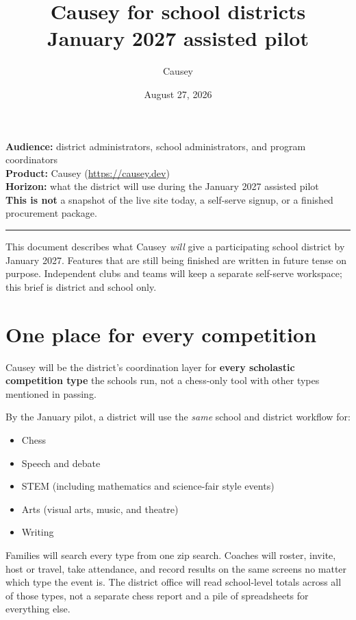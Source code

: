 \documentclass[11pt]{article}
\title{Causey for school districts\\[0.4em]
\large January 2027 assisted pilot}
\author{Causey}
\date{August 27, 2026}
\begin{document}
\maketitle

\noindent
\textbf{Audience:} district administrators, school administrators, and program coordinators\\
\textbf{Product:} Causey (\url{https://causey.dev})\\
\textbf{Horizon:} what the district will use during the January 2027 assisted pilot\\
\textbf{This is not} a snapshot of the live site today, a self-serve signup, or a finished procurement package.

\vspace{0.4em}
\hrule
\vspace{1em}

This document describes what Causey \emph{will} give a participating school district by January 2027. Features that are still being finished are written in future tense on purpose. Independent clubs and teams will keep a separate self-serve workspace; this brief is district and school only.

\section*{One place for every competition}

Causey will be the district's coordination layer for \textbf{every scholastic competition type} the schools run, not a chess-only tool with other types mentioned in passing.

By the January pilot, a district will use the \emph{same} school and district workflow for:

\begin{itemize}
  \item Chess
  \item Speech and debate
  \item STEM (including mathematics and science-fair style events)
  \item Arts (visual arts, music, and theatre)
  \item Writing
\end{itemize}

Families will search every type from one zip search. Coaches will roster, invite, host or travel, take attendance, and record results on the same screens no matter which type the event is. The district office will read school-level totals across all of those types, not a separate chess report and a pile of spreadsheets for everything else.
\end{document}
